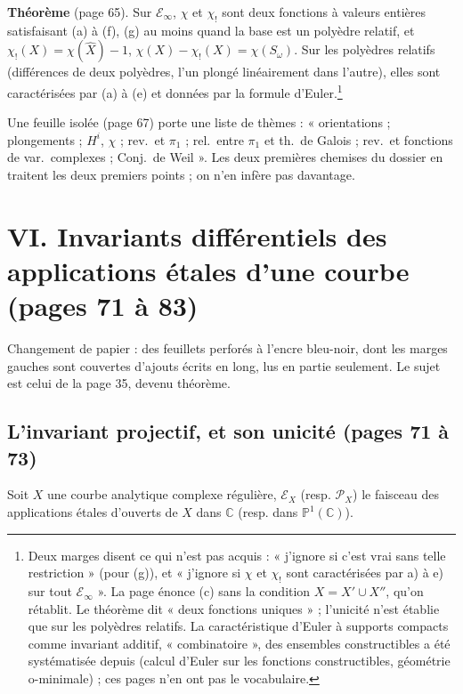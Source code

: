 \documentclass[11pt,a4paper]{article}
\begin{document}
\textbf{Théorème} (page 65). Sur $\mathcal{E}_\infty$, $\chi$ et $\chi_!$ sont
deux fonctions à valeurs entières satisfaisant (a) à (f), (g) au moins quand
la base est un polyèdre relatif, et
$\chi_!(X) = \chi(\hat X) - 1$, $\chi(X) - \chi_!(X) = \chi(S_\omega)$. Sur les
polyèdres relatifs (différences de deux polyèdres, l'un plongé linéairement
dans l'autre), elles sont caractérisées par (a) à (e) et données par la
formule d'Euler.\footnote{Deux marges disent ce qui n'est pas acquis :
« j'ignore si c'est vrai sans telle restriction » (pour (g)), et « j'ignore si
$\chi$ et $\chi_!$ sont caractérisées par a) à e) sur tout
$\mathcal{E}_\infty$ ». La page énonce (c) sans la condition $X = X' \cup X''$,
qu'on rétablit. Le théorème dit « deux fonctions uniques » ; l'unicité n'est
établie que sur les polyèdres relatifs. La caractéristique d'Euler à supports
compacts comme invariant additif, « combinatoire », des ensembles
constructibles a été systématisée depuis (calcul d'Euler sur les fonctions
constructibles, géométrie o-minimale) ; ces pages n'en ont pas le
vocabulaire.}

Une feuille isolée (page 67) porte une liste de thèmes : « orientations ;
plongements ; $H^i$, $\chi$ ; rev.\ et $\pi_1$ ; rel.\ entre $\pi_1$ et th.\ de
Galois ; rev.\ et fonctions de var.\ complexes ; Conj.\ de Weil ». Les deux
premières chemises du dossier en traitent les deux premiers points ; on n'en
infère pas davantage.

\section*{VI. Invariants différentiels des applications étales d'une courbe (pages 71 à 83)}

Changement de papier : des feuillets perforés à l'encre bleu-noir, dont les
marges gauches sont couvertes d'ajouts écrits en long, lus en partie
seulement. Le sujet est celui de la page 35, devenu théorème.

\subsection*{L'invariant projectif, et son unicité (pages 71 à 73)}

Soit $X$ une courbe analytique complexe régulière, $\mathcal{E}_X$ (resp.
$\mathcal{P}_X$) le faisceau des applications étales d'ouverts de $X$ dans
$\mathbb{C}$ (resp. dans $\mathbb{P}^1(\mathbb{C})$).
\end{document}
